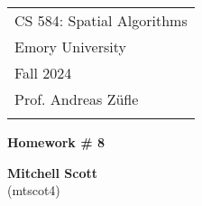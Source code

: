 \documentclass[a4paper,12pt]{article}
\theoremstyle{definition}
\theoremstyle{remark}
\begin{document}
	
	
	
	
	
	\thispagestyle{empty} %
	
	\begin{tabular}{p{15.5cm}} %
		{\large \sc CS 584: Spatial Algorithms} \\
		Emory University \\ Fall 2024 \\ Prof. Andreas Z\"ufle \\
		\hline %
		\\
	\end{tabular} %
	
	\vspace*{0.3cm} %
	
	\begin{center} %
		{\Large \bf Homework \# 8} %
		\vspace{2mm}
		
		{\bf Mitchell Scott}\\ (mtscot4) %
		
	\end{center}  
	
	\vspace{0.4cm}
	
	
	
\end{document}
